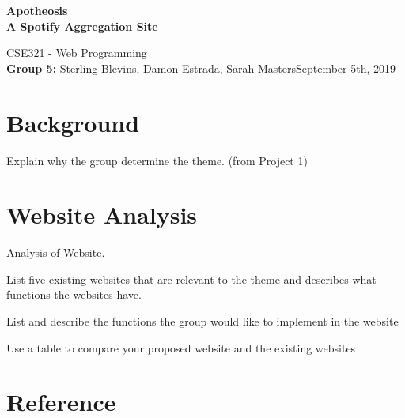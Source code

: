 \documentclass[letter, 11pt]{article}
\begin{document}
\noindent
\begin{center}
\large\textbf{Apotheosis} \\
\textbf{A Spotify Aggregation Site}
\end{center}


\normalsize CSE321 - Web Programming\\
\textbf{Group 5:} Sterling Blevins, Damon Estrada, Sarah Masters\hfill September 5th, 2019
 
\section*{Background}
Explain why the group determine the theme. (from Project 1)

\section*{Website Analysis}
Analysis of Website.

List five existing websites that are relevant to the theme and describes what functions the websites have.

List and describe the functions the group would like to implement in the website

Use a table to compare your proposed website and the existing websites


\section*{Reference}
\end{document}
